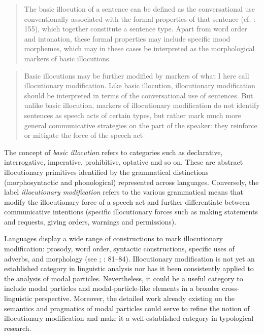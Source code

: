 \begin{quote}
The basic illocution of a sentence can be defined as the conversational use conventionally associated with the formal properties of that sentence (cf. \citealt{SadockZwicky1985}: 155), which together constitute a sentence type. Apart from word order and intonation, these formal properties may include specific mood morphemes, which may in these cases be interpreted as the morphological markers of basic illocutions. \citep[1191]{Hengeveld2004}
\end{quote}

\begin{quote}
Basic illocutions may be further modified by markers of what I here call illocutionary modification. Like basic illocution, illocutionary modification should be interpreted in terms of the conversational use of sentences. But unlike basic illocution, markers of illocutionary modification do not identify sentences as speech acts of certain types, but rather mark much more general communicative strategies on the part of the speaker: they reinforce or mitigate the force of the speech act \citep[1192]{Hengeveld2004}
\end{quote}

The concept of \textit{basic illocution} refers to categories such as declarative, interrogative, imperative, prohibitive, optative and so on. These are abstract illocutionary primitives identified by the grammatical distinctions (morphosyntactic and phonological) represented across languages. Conversely, the label \textit{illocutionary modification} refers to the various grammatical means that modify the illocutionary force of a speech act and further differentiate between communicative intentions (specific illocutionary forces such as making statements and requests, giving orders, warnings and permissions).

Languages display a wide range of constructions to mark illocutionary modification: prosody, word order, syntactic constructions, specific uses of adverbs, and morphology (see \citealt{Waltereit2001}; \citealt{HengeveldMackenzie2008}: 81–84). Illocutionary modification is not yet an established category in linguistic analysis nor has it been consistently applied to the analysis of modal particles. Nevertheless, it could be a useful category to include modal particles and modal-particle-like elements in a broader cross-linguistic perspective. Moreover, the detailed work already existing on the semantics and pragmatics of modal particles could serve to refine the notion of illocutionary modification and make it a well-established category in typological research.

